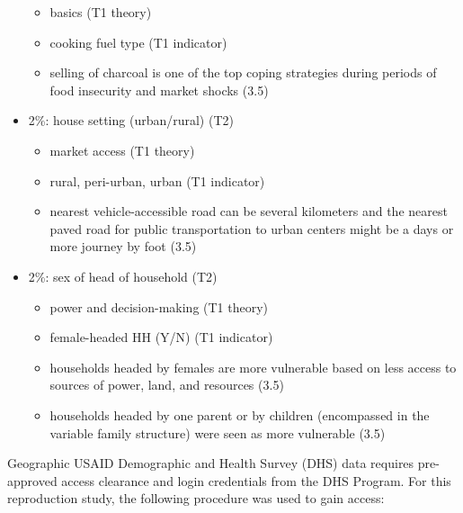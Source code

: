 \documentclass[
]{article}
\providecommand{\tightlist}{%
  \setlength{\itemsep}{0pt}\setlength{\parskip}{0pt}}
\begin{document}
\begin{itemize}
  \begin{itemize}
  \tightlist
  \item
    basics (T1 theory)
  \item
    cooking fuel type (T1 indicator)
  \item
    selling of charcoal is one of the top coping strategies during
    periods of food insecurity and market shocks (3.5)
  \end{itemize}
\item
  2\%: house setting (urban/rural) (T2)

  \begin{itemize}
  \tightlist
  \item
    market access (T1 theory)
  \item
    rural, peri-urban, urban (T1 indicator)
  \item
    nearest vehicle-accessible road can be several kilometers and the
    nearest paved road for public transportation to urban centers might
    be a days or more journey by foot (3.5)
  \end{itemize}
\item
  2\%: sex of head of household (T2)

  \begin{itemize}
  \tightlist
  \item
    power and decision-making (T1 theory)
  \item
    female-headed HH (Y/N) (T1 indicator)
  \item
    households headed by females are more vulnerable based on less
    access to sources of power, land, and resources (3.5)
  \item
    households headed by one parent or by children (encompassed in the
    variable family structure) were seen as more vulnerable (3.5)
  \end{itemize}
\end{itemize}

Geographic USAID Demographic and Health Survey (DHS) data requires
pre-approved access clearance and login credentials from the DHS
Program. For this reproduction study, the following procedure was used
to gain access:
\end{document}
